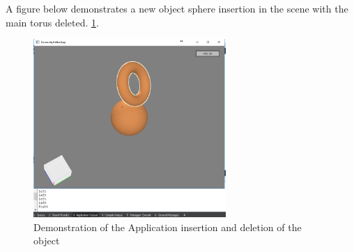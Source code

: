 \documentclass[a4,10pt]{article}
\begin{document}
	    A figure below demonstrates a new object sphere insertion in the scene with the main torus deleted. \cref{fig:manipulate}.

\begin{figure}[h]
  \centering
  \includegraphics[width=0.65\textwidth]{gfx/manipulate.png}
  \caption{Demonstration of the Application insertion and deletion of the object}
  \label{fig:manipulate}
\end{figure}
\end{document}
